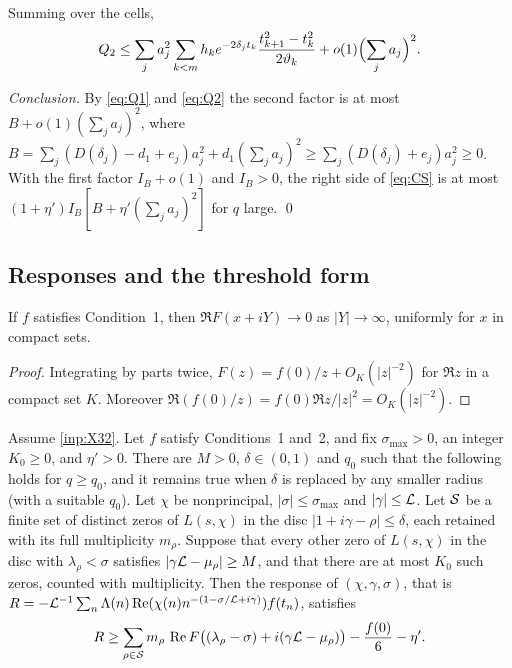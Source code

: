 Summing over the cells,
\begin{equation}\label{eq:Q2}
  Q_2\le\sum_ja_j^2\sum_{k<m}h_ke^{-2\delta_jt_k}\frac{t_{k+1}^2-t_k^2}{2\vartheta_k}
  +o(1)\Bigl(\sum_ja_j\Bigr)^2 .
\end{equation}

\emph{Conclusion.} By \eqref{eq:Q1} and \eqref{eq:Q2} the second factor is at most
$B+o(1)(\sum_ja_j)^2$, where
$B=\sum_j(D(\delta_j)-d_1+e_j)a_j^2+d_1(\sum_ja_j)^2\ge\sum_j(D(\delta_j)+e_j)a_j^2\ge0$. With the first
factor $I_B+o(1)$ and $I_B>0$, the right side of \eqref{eq:CS} is at most
$(1+\eta')I_B[B+\eta'(\sum_ja_j)^2]$ for $q$ large. \qed

\subsection{Responses and the threshold form}

\begin{lemma}\label{lem:decaytransform}
If $f$ satisfies Condition~1, then $\Re F(x+iY)\to0$ as $|Y|\to\infty$, uniformly for $x$ in
compact sets.
\end{lemma}

\begin{proof}
Integrating by parts twice, $F(z)=f(0)/z+O_K(|z|^{-2})$ for $\Re z$ in a compact set $K$. Moreover
$\Re(f(0)/z)=f(0)\Re z/|z|^2=O_K(|z|^{-2})$.
\end{proof}

\begin{lemma}\label{lem:response}
Assume \cref{inp:X32}. Let $f$ satisfy Conditions~1 and~2, and fix $\sigma_{\max}>0$, an integer $K_0\ge0$, and
$\eta'>0$. There are $M>0$, $\delta\in(0,1)$ and $q_0$ such that the following holds for $q\ge q_0$,
and it remains true when $\delta$ is replaced by any smaller radius (with a suitable $q_0$).
Let $\chi$ be nonprincipal, $|\sigma|\le\sigma_{\max}$ and $|\gamma|\le\mathcal{L}$. Let $\mathcal{S}$ be a finite set
of distinct zeros of $L(s,\chi)$ in the disc $|1+i\gamma-\rho|\le\delta$, each retained with its
full multiplicity $m_\rho$. Suppose that every other zero of
$L(s,\chi)$ in the disc with $\lambda_\rho<\sigma$ satisfies $|\gamma\mathcal{L}-\mu_\rho|\ge M$, and that there
are at most $K_0$ such zeros, counted with multiplicity. Then the response of $(\chi,\gamma,\sigma)$,
that is $R=-\mathcal{L}^{-1}\sum_n\Lambda(n)\operatorname{Re}(\chi(n)n^{-(1-\sigma/\mathcal{L}+i\gamma)})f(t_n)$, satisfies
\[
  R\ge\sum_{\rho\in\mathcal{S}}m_\rho\,\operatorname{Re} F\bigl((\lambda_\rho-\sigma)+i(\gamma\mathcal{L}-\mu_\rho)\bigr)
  -\frac{f(0)}6-\eta' .
\]
\end{lemma}

